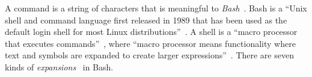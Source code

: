 A command is a string of characters that is meaningful to \emph{Bash}~\cite{gnu_bash}. Bash is a \enquote{Unix shell and command language first released in 1989 that has been used as the default login shell for most Linux distributions}~\cite{bash}. A shell is a \enquote{macro processor that executes commands}~\cite{bash_manual}, where \enquote{macro processor means functionality where text and symbols are expanded to create larger expressions}~\cite{bash_manual}. There are seven kinds of \emph{expansions}~\cite{bash_expansions_ref} in Bash.